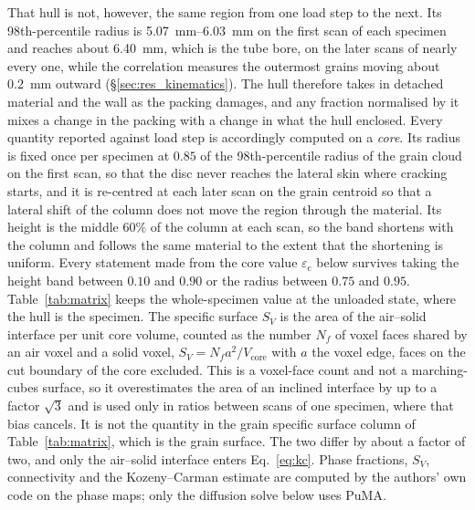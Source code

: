 \documentclass[preprint,12pt,numbers]{elsarticle}
\begin{document}
  That hull is not, however, the same region from one load step to the next.
  Its 98th-percentile radius is \SIrange{5.07}{6.03}{\milli\meter} on the first
  scan of each specimen and reaches about \SI{6.40}{\milli\meter}, which is the
  tube bore, on the later scans of nearly every one, while the correlation
  measures the outermost grains moving about \SI{0.2}{\milli\meter} outward
  (\S\ref{sec:res_kinematics}).  The hull therefore takes in detached material
  and the wall as the packing damages, and any fraction normalised by it mixes
  a change in the packing with a change in what the hull enclosed.  Every
  quantity reported against load step is accordingly computed on a
  \emph{core}.  Its radius is fixed once per specimen at $0.85$ of the
  98th-percentile radius of the grain cloud on the first scan, so that the
  disc never reaches the lateral skin where cracking starts, and it is
  re-centred at each later scan on the grain centroid so that a lateral shift
  of the column does not move the region through the material.  Its height is
  the middle $60\%$ of the column at each scan, so the band shortens with the
  column and follows the same material to the extent that the shortening is
  uniform.  Every statement made from the core value
  $\varepsilon_\mathrm{c}$ below survives taking the height band between
  $0.10$ and $0.90$ or the radius between $0.75$ and $0.95$.  Table~\ref{tab:matrix} keeps the
  whole-specimen value at the unloaded state, where the hull is the specimen.
  The specific surface $S_V$ is the area of the air--solid interface per unit
  core volume, counted as the number $N_f$ of voxel faces shared by an air
  voxel and a solid voxel, $S_V = N_f a^2 / V_\mathrm{core}$ with $a$ the
  voxel edge, faces on the cut boundary of the core excluded.  This is a
  voxel-face count and not a marching-cubes surface, so it overestimates the
  area of an inclined interface by up to a factor $\sqrt3$ and is used only
  in ratios between scans of one specimen, where that bias cancels.  It is not
  the quantity in the grain specific surface column of Table~\ref{tab:matrix},
  which is the grain surface.  The two differ by about a factor of two, and
  only the air--solid interface enters Eq.~\eqref{eq:kc}.  Phase fractions,
  $S_V$, connectivity and the Kozeny--Carman estimate are computed by the
  authors' own code on the phase maps; only the diffusion solve below uses
  PuMA.
\end{document}
